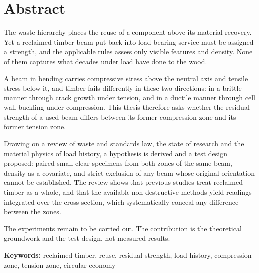 \chapter*{Abstract}

The waste hierarchy places the reuse of a component above its material
recovery. Yet a reclaimed timber beam put back into load-bearing service must
be assigned a strength, and the applicable rules assess only visible features
and density. None of them captures what decades under load have done to the
wood.

A beam in bending carries compressive stress above the neutral axis and
tensile stress below it, and timber fails differently in these two
directions: in a brittle manner through crack growth under tension, and in a
ductile manner through cell wall buckling under compression. This thesis
therefore asks whether the residual strength of a used beam differs between
its former compression zone and its former tension zone.

Drawing on a review of waste and standards law, the state of research and the
material physics of load history, a hypothesis is derived and a test design
proposed: paired small clear specimens from both zones of the same beam,
density as a covariate, and strict exclusion of any beam whose original
orientation cannot be established. The review shows that previous studies
treat reclaimed timber as a whole, and that the available non-destructive
methods yield readings integrated over the cross section, which systematically
conceal any difference between the zones.

The experiments remain to be carried out. The contribution is the theoretical
groundwork and the test design, not measured results.

\medskip
\noindent\textbf{Keywords:} reclaimed timber, reuse, residual strength, load
history, compression zone, tension zone, circular economy

